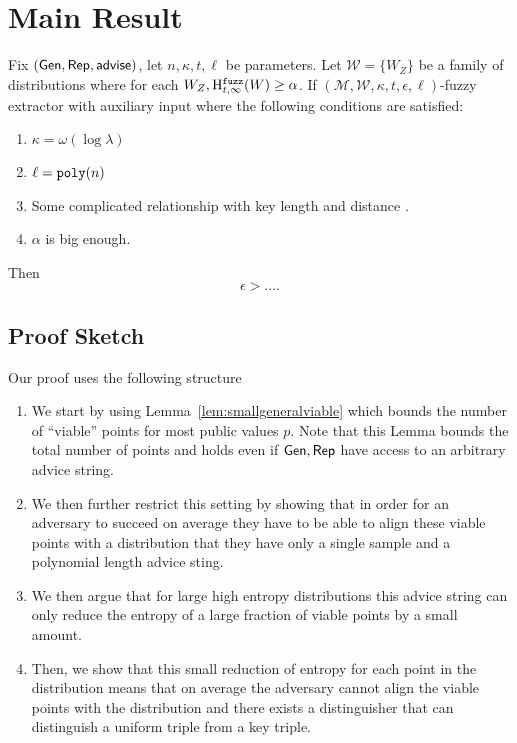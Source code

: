 

\section{Main Result}
\begin{theorem}
Fix $({\mathsf{Gen}}, {\mathsf{Rep}}, {\mathsf{advise}})$, let $n, \kappa, t, \ell $ be parameters.  Let $\mathcal{W} = \{W_Z\}$ be a family of distributions where for each $W_Z, \mathrm{H}^{\mathtt{fuzz}}_{t,\infty}(W) \ge \alpha$.  If $(\mathcal{M,W},\kappa, t, \epsilon, \ell)$-fuzzy extractor with auxiliary input where the following conditions are satisfied:
\begin{enumerate}
\itemsep0em
\item $\kappa = \omega(\log \lambda)$ 
\item $\ell = \mathtt{poly}(n)$ 
\item Some complicated relationship with key length and distance .
\item $\alpha$ is big enough.
\end{enumerate}
Then \[
\epsilon> ....\]
\end{theorem}

\subsection{Proof Sketch}
Our proof uses the following structure
\begin{enumerate}
\item We start by using Lemma~\ref{lem:smallgeneralviable} which bounds the number of ``viable'' points for most public values $p$.  Note that this Lemma bounds the total number of points and holds even if ${\mathsf{Gen}}, {\mathsf{Rep}}$ have access to an arbitrary advice string.
\item We then further restrict this setting by showing that in order for an adversary to succeed on average they have to be able to align these viable points with a distribution that they have only a single sample and a polynomial length advice sting. 
\item We then argue that for large high entropy distributions this advice string can only reduce the entropy of a large fraction of viable points by a small amount. 
\item Then, we show that this small reduction of entropy for each point in the distribution means that on average the adversary cannot align the viable points with the distribution and there exists a distinguisher that can distinguish a uniform triple from a key triple. 
\end{enumerate}

